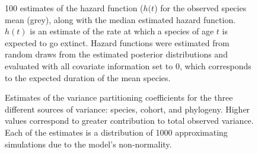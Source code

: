 \documentclass{nature}
\begin{document}
\begin{figure}[ht]
  \caption{100 estimates of the hazard function (\(h(t\)) for the observed species mean (grey), along with the median estimated hazard function. \(h(t)\) is an estimate of the rate at which a species of age \(t\) is expected to go extinct. Hazard functions were estimated from random draws from the estimated posterior distributions and evaluated with all covariate information set to 0, which corresponds to the expected duration of the mean species.}
  \label{fig:haz}
\end{figure}

\begin{figure}[ht]
  \caption{Estimates of the variance partitioning coefficients for the three different sources of variance: species, cohort, and phylogeny. Higher values correspond to greater contribution to total observed variance. Each of the estimates is a distribution of 1000 approximating simulations due to the model's non-normality.}
  \label{fig:vpc}
\end{figure}
\end{document}
